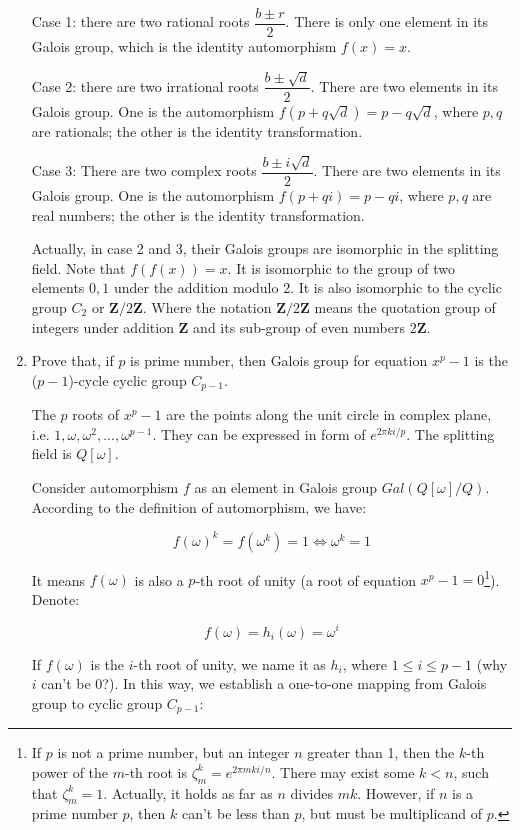 \documentclass[UTF8]{article}
\begin{document}
\begin{enumerate}
Case 1: there are two rational roots $\dfrac{b \pm r}{2}$. There is only one element in its Galois group, which is the identity automorphism $f(x) = x$.

Case 2: there are two irrational roots $\dfrac{b \pm \sqrt{d}}{2}$. There are two elements in its Galois group. One is the automorphism $f(p + q \sqrt{d}) = p - q \sqrt{d}$, where $p, q$ are rationals; the other is the identity transformation.

Case 3: There are two complex roots $\dfrac{b \pm i \sqrt{d}}{2}$. There are two elements in its Galois group. One is the automorphism $f(p + q i) = p - q i$, where $p, q$ are real numbers; the other is the identity transformation.

Actually, in case 2 and 3, their Galois groups are isomorphic in the splitting field. Note that $f(f(x)) = x$. It is isomorphic to the group of two elements ${0, 1}$ under the addition modulo 2. It is also isomorphic to the cyclic group $C_2$ or $\pmb{Z}/2\pmb{Z}$. Where the notation $\pmb{Z}/2\pmb{Z}$ means the quotation group of integers under addition $\pmb{Z}$ and its sub-group of even numbers $2\pmb{Z}$.

\item{Prove that, if $p$ is prime number, then Galois group for equation $x^p - 1$ is the ($p-1$)-cycle cyclic group $C_{p-1}$.}

The $p$ roots of $x^p - 1$ are the points along the unit circle in complex plane, i.e. $1, \omega, \omega^2, ..., \omega^{p-1}$. They can be expressed in form of $e^{2 \pi k i / p}$. The splitting field is $Q[\omega]$.

Consider automorphism $f$ as an element in Galois group $Gal(Q[\omega]/Q)$. According to the definition of automorphism, we have:

\[
f(\omega)^k = f(\omega^k) = 1 \iff \omega^k = 1
\]

It means $f(\omega)$ is also a $p$-th root of unity (a root of equation $x^p - 1 = 0$\footnote{If $p$ is not a prime number, but an integer $n$ greater than 1, then the $k$-th power of the $m$-th root is $\zeta_m^k = e^{2 \pi m k i / n}$. There may exist some $k < n$, such that $\zeta_m^k = 1$. Actually, it holds as far as $n$ divides $mk$. However, if $n$ is a prime number $p$, then $k$ can't be less than $p$, but must be multiplicand of $p$.}). Denote:

\[
f(\omega) = h_i(\omega) = \omega^{i}
\]

If $f(\omega)$ is the $i$-th root of unity, we name it as $h_i$, where $1 \leq i \leq p-1$ (why $i$ can't be 0?). In this way, we establish a one-to-one mapping from Galois group to cyclic group $C_{p-1}$:


\end{enumerate}
\end{document}
